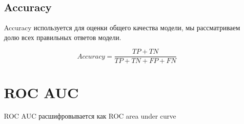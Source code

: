 \documentclass{article}
\begin{document}
        \subsection{Accuracy}
            Accuracy используется для оценки общего качества модели,
            мы рассматриваем долю всех правильных ответов модели.


            \begin{equation}
                Accuracy = \dfrac{TP + TN}{TP + TN + FP + FN}
            \end{equation}

    \section{ROC AUC}
        ROC AUC расшифровывается как ROC area under curve
\end{document}
